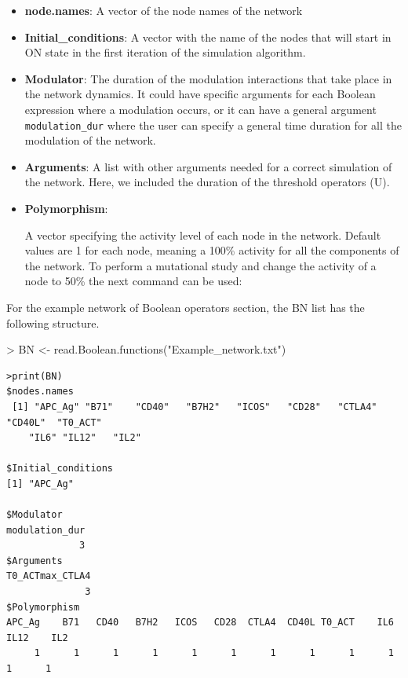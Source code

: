 \documentclass[a4paper]{article}
\begin{document}
\begin{itemize}
\item{\textbf{node.names}:}{ A vector of the node names of the network}
\item{\textbf{Initial\_conditions}:}{ A vector with the name of the nodes that will start in ON state in the first iteration of the simulation algorithm.}
\item{\textbf{Modulator}:}{ The duration of the modulation interactions that take place in the network dynamics. It could have specific arguments for each Boolean expression where a modulation occurs, or it can have a general argument \texttt{modulation\_dur} where the user can specify a general time duration for all the modulation of the network.}
\item{\textbf{Arguments}:}{ A list with other arguments needed for a correct simulation of the network. Here, we included the duration of the threshold operators (U). }
\item{\textbf{Polymorphism}:}{ A vector specifying the activity level of each node in the network. Default values are 1 for each node, meaning a 100\% activity for all the components of the network. To perform a mutational study and change the activity of a node to 50\% the next command can be used: 
\begin{Schunk}
\end{Schunk}
}
\end{itemize}

For the example network of Boolean operators section, the BN list has the following structure.
\begin{Schunk}
\begin{Sinput}
> BN <- read.Boolean.functions("Example_network.txt")
\end{Sinput}
\end{Schunk}
\begin{verbatim}
>print(BN)
$nodes.names
 [1] "APC_Ag" "B71"    "CD40"   "B7H2"   "ICOS"   "CD28"   "CTLA4"  "CD40L"  "T0_ACT"
    "IL6" "IL12"   "IL2"

$Initial_conditions
[1] "APC_Ag"

$Modulator
modulation_dur
             3
$Arguments
T0_ACTmax_CTLA4 
              3 
$Polymorphism
APC_Ag    B71   CD40   B7H2   ICOS   CD28  CTLA4  CD40L T0_ACT    IL6   IL12    IL2 
     1      1      1      1      1      1      1      1      1      1      1      1 

\end{verbatim}
\end{document}
